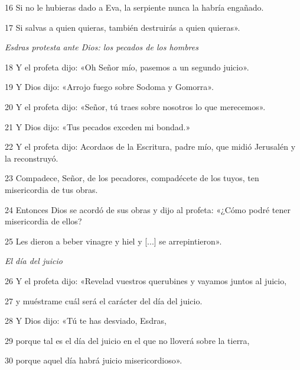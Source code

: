 \par 16 Si no le hubieras dado a Eva, la serpiente nunca la habría engañado.

\par 17 Si salvas a quien quieras, también destruirás a quien quieras».

\par \textit{Esdras protesta ante Dios: los pecados de los hombres}

\par 18 Y el profeta dijo: «Oh Señor mío, pasemos a un segundo juicio».

\par 19 Y Dios dijo: «Arrojo fuego sobre Sodoma y Gomorra». 

\par 20 Y el profeta dijo: «Señor, tú traes sobre nosotros lo que merecemos».

\par 21 Y Dios dijo: «Tus pecados exceden mi bondad.»

\par 22 Y el profeta dijo: Acordaos de la Escritura, padre mío, que midió Jerusalén y la reconstruyó.

\par 23 Compadece, Señor, de los pecadores, compadécete de los tuyos, ten misericordia de tus obras.

\par 24 Entonces Dios se acordó de sus obras y dijo al profeta: «¿Cómo podré tener misericordia de ellos?

\par 25 Les dieron a beber vinagre y hiel y [...] se arrepintieron».

\par \textit{El día del juicio}

\par 26 Y el profeta dijo: «Revelad vuestros querubines y vayamos juntos al juicio,

\par 27 y muéstrame cuál será el carácter del día del juicio. 

\par 28 Y Dios dijo: «Tú te has desviado, Esdras,

\par 29 porque tal es el día del juicio en el que no lloverá sobre la tierra,

\par 30 porque aquel día habrá juicio misericordioso». 

